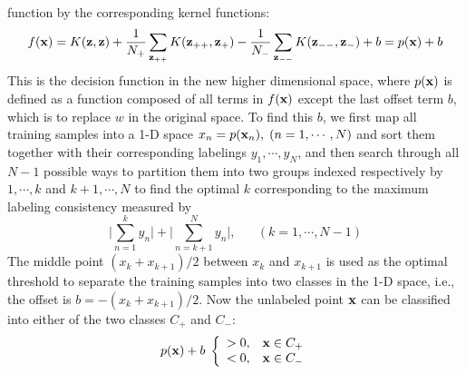 \documentclass{article}
\begin{document}
function by the corresponding kernel functions:
\begin{equation}
  f({\bf x})=K({\bf z},{\bf z})
  +\frac{1}{N_+}\sum_{{\bf z}_{++}}K({\bf z}_{++},{\bf z}_+)
  -\frac{1}{N_-}\sum_{{\bf z}_{--}}K({\bf z}_{--},{\bf z}_-)+b
  =p({\bf x})+b
  \label{TypeIII}
\end{equation}
This is the decision function in the new higher dimensional space,
where $p({\bf x})$ is defined as a function composed of all terms 
in $f({\bf x})$ except the last offset term $b$, which is to replace 
$w$ in the original space. To find this $b$, we first map all 
training samples into a 1-D space $x_n=p({\bf x}_n),\;(n=1,\cdots,N)$
and sort them together with their corresponding labelings 
$y_1,\cdots,y_N$, and then search through all $N-1$ possible 
ways to partition them into two groups indexed respectively by 
$1,\cdots,k$ and $k+1,\cdots,N$ to find the optimal $k$ corresponding 
to the maximum labeling consistency measured by
\begin{equation}
  \bigg|\sum_{n=1}^k y_n\bigg|+\bigg|\sum_{n=k+1}^N y_n\bigg|,
  \;\;\;\;\;\;(k=1,\cdots,N-1)
  \label{LabelingConsistency}
\end{equation}
The middle point $(x_k+x_{k+1})/2$ between $x_k$ and $x_{k+1}$ is used
as the optimal threshold to separate the training samples into two 
classes in the 1-D space, i.e., the offset is $b=-(x_k+x_{k+1})/2$. 
Now the unlabeled point ${\bf x}$ can be classified into either of 
the two classes $C_+$ and $C_-$:
\begin{equation}
  p({\bf x})+b\;\left\{\begin{array}{ll}>0, & {\bf x}\in C_+\\
    <0, & {\bf x}\in C_-\end{array}\right.
\end{equation}
\end{document}
